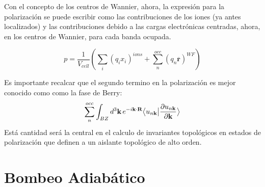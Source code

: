 Con el concepto de los centros de Wannier, ahora, la expresión para la polarización se puede escribir como las contribuciones de los iones (ya antes localizados) y las contribuciones debido a las cargas electrónicas centradas, ahora, en los centros de Wannier, para cada banda ocupada.

\begin{equation}
    p = \frac{1}{V_{cell}} (\sum_i (q_i x_i)^{ions} + \sum_n^{occ}(q_n \overline{\textbf{r}})^{WF})
\end{equation}

Es importante recalcar que el segundo termino en la polarización es mejor conocido como como la fase de Berry:
\begin{equation}
    \label{Barry_fase}
    \sum_n^{occ}\int_{BZ} d^3\textbf{k}\,e^{-i\textbf{k}\cdot\textbf{R}}\big \langle{u_{n\textbf{k}}}\big | {\frac{\partial u_{n\textbf{k}} }{\partial\textbf{k}}} \big \rangle
\end{equation}
Está cantidad será la central en el calculo de invariantes topológicos en estados de polarización que definen a un aislante topológico de alto orden. 


\section{Bombeo Adiabático}

